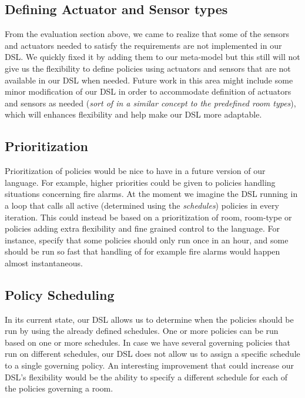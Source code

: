 \subsection{Defining Actuator and Sensor types}\label{subsec:def-sensor-actuator-types}
From the evaluation section above, we came to realize that some of the sensors and actuators needed to satisfy the requirements are not implemented in our DSL. We quickly fixed it by adding them to our meta-model but this still will not give us the flexibility to define policies using actuators and sensors that are not available in our DSL when needed. Future work in this area might include some minor modification of our DSL in order to accommodate definition of actuators and sensors as needed (\textit{sort of in a similar concept to the predefined room types}), which will enhances flexibility and help make our DSL more adaptable.

\subsection{Prioritization}\label{subsec:looptime}
Prioritization of policies would be nice to have in a future version of our language. For example, higher priorities could be given to policies handling situations concerning fire alarms. At the moment we imagine the DSL running in a loop that calls all active (determined using the \textit{schedules}) policies in every iteration. This could instead be based on a prioritization of room, room-type or policies adding extra flexibility and fine grained control to the language. For instance, specify that some policies should only run once in an hour, and some should be run so fast that handling of for example fire alarms would happen almost instantaneous. 

\subsection{Policy Scheduling}\label{subsec:during}
In its current state, our DSL allows us to determine when the policies should be run by using the already defined schedules. One or more policies can be run based on one or more schedules. 
In case we have several governing policies that run on different schedules, our DSL does not allow us to assign a specific schedule to a single governing policy. An interesting improvement that could increase our DSL's flexibility would be the ability to specify a different schedule for each of the policies governing a room.